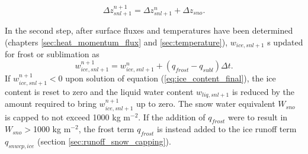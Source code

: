 \documentclass[12pt,authoryear]{elsarticle}
\numberwithin{equation}{section} %
\begin{document}
\begin{equation}
\Delta z_{snl+1}^{n+1} = \Delta z_{snl+1}^{n} + \Delta z_{sno}.
\end{equation}

In the second step, after surface fluxes and temperatures have been determined (chapters \ref{sec:heat_momentum_flux} and \ref{sec:temperature}), $w_{ice,snl+1}$ s updated for frost or sublimation as
\begin{equation}
\label{eq:ice_content_final}
w_{ice,snl+1}^{n+1} = w_{ice,snl+1}^{n} + (q_{frost}-q_{subl})\Delta t.
\end{equation}
If $w_{ice,snl+1}^{n+1}<$0 upon solution of equation (\ref{eq:ice_content_final}), the ice content is reset to zero and the liquid water content $w_{liq,snl+1}$ is reduced by the amount required to bring $w_{ice,snl+1}^{n+1}$ up to zero. The snow water equivalent $W_{sno}$ is capped to not exceed 1000 kg m$^{-2}$. If the addition of $q_{frost}$ were to result in $W_{sno}>$1000 kg m$^{-2}$, the frost term $q_{frost}$ is instead added to the ice runoff term $q_{snwcp,ice}$ (section \ref{sec:runoff_snow_capping}).

\end{document}
